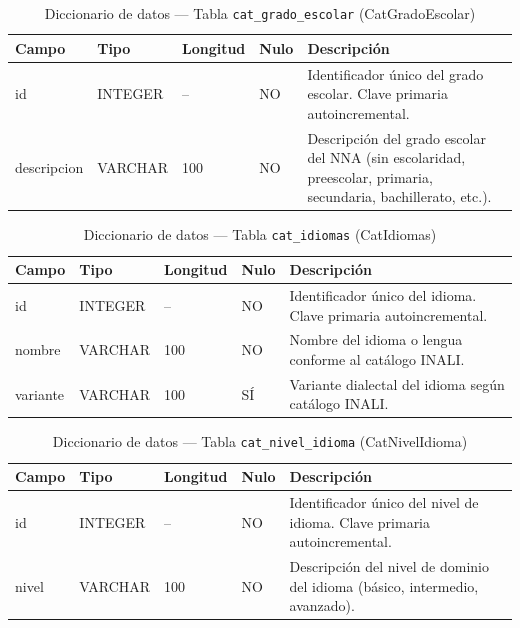 \begin{table}[H]
	\centering
	\caption{Diccionario de datos --- Tabla \texttt{cat\_grado\_escolar} (CatGradoEscolar)}
	\label{tab:data-dict-cat_grado_escolar}
	\scriptsize
	\begin{tabular}{>{\ttfamily\raggedright\arraybackslash}p{3.6cm} p{1.6cm} p{1.3cm} p{0.7cm} p{5.6cm}}
		\toprule
		\textbf{Campo} & \textbf{Tipo} & \textbf{Longitud} & \textbf{Nulo} & \textbf{Descripción} \\
		\midrule
		id & INTEGER & -- & NO & Identificador único del grado escolar. Clave primaria autoincremental. \\
		descripcion & VARCHAR & 100 & NO & Descripción del grado escolar del NNA (sin escolaridad, preescolar, primaria, secundaria, bachillerato, etc.). \\
		\bottomrule
	\end{tabular}
\end{table}

\begin{table}[H]
	\centering
	\caption{Diccionario de datos --- Tabla \texttt{cat\_idiomas} (CatIdiomas)}
	\label{tab:data-dict-cat_idiomas}
	\scriptsize
	\begin{tabular}{>{\ttfamily\raggedright\arraybackslash}p{3.6cm} p{1.6cm} p{1.3cm} p{0.7cm} p{5.6cm}}
		\toprule
		\textbf{Campo} & \textbf{Tipo} & \textbf{Longitud} & \textbf{Nulo} & \textbf{Descripción} \\
		\midrule
		id & INTEGER & -- & NO & Identificador único del idioma. Clave primaria autoincremental. \\
		nombre & VARCHAR & 100 & NO & Nombre del idioma o lengua conforme al catálogo INALI. \\
		variante & VARCHAR & 100 & SÍ & Variante dialectal del idioma según catálogo INALI. \\
		\bottomrule
	\end{tabular}
\end{table}

\begin{table}[H]
	\centering
	\caption{Diccionario de datos --- Tabla \texttt{cat\_nivel\_idioma} (CatNivelIdioma)}
	\label{tab:data-dict-cat_nivel_idioma}
	\scriptsize
	\begin{tabular}{>{\ttfamily\raggedright\arraybackslash}p{3.6cm} p{1.6cm} p{1.3cm} p{0.7cm} p{5.6cm}}
		\toprule
		\textbf{Campo} & \textbf{Tipo} & \textbf{Longitud} & \textbf{Nulo} & \textbf{Descripción} \\
		\midrule
		id & INTEGER & -- & NO & Identificador único del nivel de idioma. Clave primaria autoincremental. \\
		nivel & VARCHAR & 100 & NO & Descripción del nivel de dominio del idioma (básico, intermedio, avanzado). \\
		\bottomrule
	\end{tabular}
\end{table}

